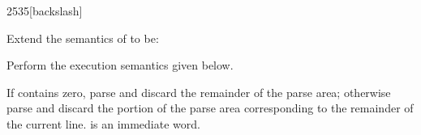\begin{worddef}[bs]{2535}{\bs}[backslash]
\item Extend the semantics of  to be:

\compile
	Perform the execution semantics given below.

\execute

	If  contains zero, parse and discard the remainder
	of the parse area; otherwise parse and discard the portion
	of the parse area corresponding to the remainder of the current
	line.  is an immediate word.
\end{worddef}
